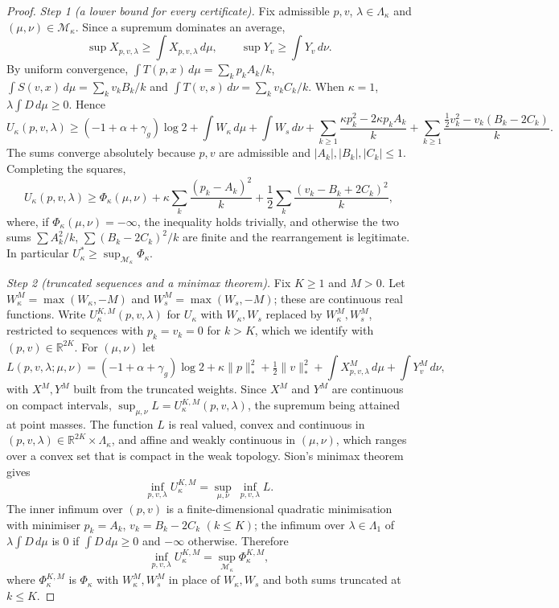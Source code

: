 \documentclass[11pt]{article}
\theoremstyle{definition}
\begin{document}
\begin{proof}
\emph{Step 1 (a lower bound for every certificate).} Fix admissible $p,v$, $\lambda\in\Lambda_\kappa$ and $(\mu,\nu)\in\mathcal M_\kappa$. Since a supremum dominates an average,
\[
\sup X_{p,v,\lambda}\ge\int X_{p,v,\lambda}\,d\mu,\qquad \sup Y_v\ge\int Y_v\,d\nu .
\]
By uniform convergence, $\int T(p,x)\,d\mu=\sum_kp_kA_k/k$, $\int S(v,x)\,d\mu=\sum_kv_kB_k/k$ and $\int T(v,s)\,d\nu=\sum_kv_kC_k/k$. When $\kappa=1$, $\lambda\int D\,d\mu\ge0$. Hence
\[
U_\kappa(p,v,\lambda)\ge(-1+\alpha+\gamma_g)\log2+\int W_\kappa\,d\mu+\int W_s\,d\nu+\sum_{k\ge1}\frac{\kappa p_k^2-2\kappa p_kA_k}{k}+\sum_{k\ge1}\frac{\tfrac12v_k^2-v_k(B_k-2C_k)}{k}.
\]
The sums converge absolutely because $p,v$ are admissible and $|A_k|,|B_k|,|C_k|\le1$. Completing the squares,
\begin{equation}\label{eq:step1}
U_\kappa(p,v,\lambda)\ge\Phi_\kappa(\mu,\nu)+\kappa\sum_k\frac{(p_k-A_k)^2}{k}+\frac12\sum_k\frac{(v_k-B_k+2C_k)^2}{k},
\end{equation}
where, if $\Phi_\kappa(\mu,\nu)=-\infty$, the inequality holds trivially, and otherwise the two sums $\sum A_k^2/k$, $\sum(B_k-2C_k)^2/k$ are finite and the rearrangement is legitimate. In particular $U^*_\kappa\ge\sup_{\mathcal M_\kappa}\Phi_\kappa$.

\emph{Step 2 (truncated sequences and a minimax theorem).} Fix $K\ge1$ and $M>0$. Let $W_\kappa^M=\max(W_\kappa,-M)$ and $W_s^M=\max(W_s,-M)$; these are continuous real functions. Write $U^{K,M}_\kappa(p,v,\lambda)$ for $U_\kappa$ with $W_\kappa,W_s$ replaced by $W^M_\kappa,W^M_s$, restricted to sequences with $p_k=v_k=0$ for $k>K$, which we identify with $(p,v)\in\mathbb R^{2K}$. For $(\mu,\nu)$ let
\[
L(p,v,\lambda;\mu,\nu)=(-1+\alpha+\gamma_g)\log2+\kappa\|p\|_*^2+\tfrac12\|v\|_*^2+\int X^M_{p,v,\lambda}\,d\mu+\int Y^M_v\,d\nu,
\]
with $X^M,Y^M$ built from the truncated weights. Since $X^M$ and $Y^M$ are continuous on compact intervals, $\sup_{\mu,\nu}L=U^{K,M}_\kappa(p,v,\lambda)$, the supremum being attained at point masses. The function $L$ is real valued, convex and continuous in $(p,v,\lambda)\in\mathbb R^{2K}\times\Lambda_\kappa$, and affine and weakly continuous in $(\mu,\nu)$, which ranges over a convex set that is compact in the weak topology. Sion's minimax theorem \cite{Sion} gives
\[
\inf_{p,v,\lambda}U^{K,M}_\kappa=\sup_{\mu,\nu}\ \inf_{p,v,\lambda}L .
\]
The inner infimum over $(p,v)$ is a finite-dimensional quadratic minimisation with minimiser $p_k=A_k$, $v_k=B_k-2C_k$ $(k\le K)$; the infimum over $\lambda\in\Lambda_1$ of $\lambda\int D\,d\mu$ is $0$ if $\int D\,d\mu\ge0$ and $-\infty$ otherwise. Therefore
\[
\inf_{p,v,\lambda}U^{K,M}_\kappa=\sup_{\mathcal M_\kappa}\Phi^{K,M}_\kappa,
\]
where $\Phi^{K,M}_\kappa$ is $\Phi_\kappa$ with $W^M_\kappa,W^M_s$ in place of $W_\kappa,W_s$ and both sums truncated at $k\le K$.


\end{proof}
\end{document}
